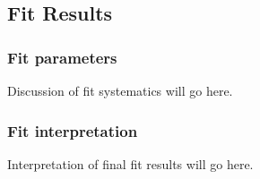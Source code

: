 \subsection{Fit Results}
\label{sec:FitResults}

\subsubsection{Fit parameters}
\label{sec:FitParameterResults}

Discussion of fit systematics will go here.

\subsubsection{Fit interpretation}
\label{sec:FitInterpretation}

Interpretation of final fit results will go here.

